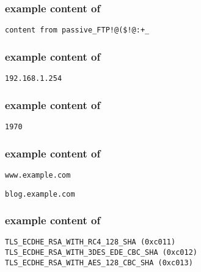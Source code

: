 \pagebreak

\hypertarget{passiveformat}{}
\subsubsection*{example content of \texttt{\hyperlink{cp1ftp}{\filepassive}}}
\begin{mdframed}
\begin{Verbatim}
content from passive_FTP!@($!@:+_
\end{Verbatim}
\end{mdframed}

\hypertarget{portscanformat}{}
\subsubsection*{example content of \texttt{\hyperlink{cp1portscan}{\fileportscan}}}
\begin{mdframed}
\begin{Verbatim}
192.168.1.254
\end{Verbatim}
\end{mdframed}

\hypertarget{yearformat}{}
\subsubsection*{example content of \texttt{\hyperlink{cp1year}{\fileyear}}}
\begin{mdframed}
\begin{Verbatim}
1970
\end{Verbatim}
\end{mdframed}

\hypertarget{domainformat}{}
\subsubsection*{example content of \texttt{\hyperlink{cp1domain}{\filedomain}}}
\begin{mdframed}
\begin{Verbatim}
www.example.com
\end{Verbatim}
\end{mdframed}
\vspace{-15pt}
\begin{mdframed}
\begin{Verbatim}
blog.example.com
\end{Verbatim}
\end{mdframed}

\hypertarget{cslistformat}{}
\subsubsection*{example content of \texttt{\hyperlink{cp1cslist}{\filecslist}}}
\begin{mdframed}
\begin{Verbatim}
TLS_ECDHE_RSA_WITH_RC4_128_SHA (0xc011)
TLS_ECDHE_RSA_WITH_3DES_EDE_CBC_SHA (0xc012)
TLS_ECDHE_RSA_WITH_AES_128_CBC_SHA (0xc013)
\end{Verbatim}
\end{mdframed}


